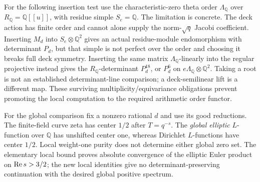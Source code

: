 \documentclass[11pt]{article}
\theoremstyle{definition}\newtheorem{definition}[theorem]{Definition}
\theoremstyle{remark}\newtheorem{remark}[theorem]{Remark}
\begin{document}
For the following insertion test use the characteristic-zero theta order $\Lambda_{\mathbb{Q}}$ over $R_{\mathbb{Q}}=\mathbb{Q}[[u]]$, with residue simple $S_e=\mathbb{Q}$. The limitation is concrete. The deck action has finite order and cannot alone supply the norm-$\sqrt q$ Jacobi coefficient. Inserting $M_d$ into $S_e\otimes\mathbb{Q}^2$ gives an actual residue-module endomorphism with determinant $P_d$, but that simple is not perfect over the order and choosing it breaks full deck symmetry. Inserting the same matrix $\Lambda_{\mathbb{Q}}$-linearly into the regular projective instead gives the $R_{\mathbb{Q}}$-determinant $P_d^{18}$, or $P_d^6$ on $e\Lambda_{\mathbb{Q}}\otimes\mathbb{Q}^2$. Taking a root is not an established determinant-line comparison; a deck-semilinear lift is a different map. These surviving multiplicity/equivariance obligations prevent promoting the local computation to the required arithmetic order functor.

For the global comparison fix a nonzero rational $d$ and use its good reductions. The finite-field curve zeta has center $1/2$ after $T=q^{-s}$. The \emph{global elliptic} $L$-function over $\mathbb{Q}$ has unshifted center one, whereas Dirichlet $L$-functions have center $1/2$. Local weight-one purity does not determine either global zero set. The elementary local bound proves absolute convergence of the elliptic Euler product on $\operatorname{Re} s>3/2$; the new local identities give no determinant-preserving continuation with the desired global positive spectrum.
\end{document}
